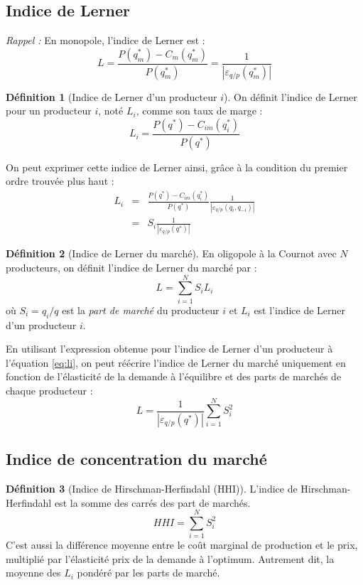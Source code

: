 \documentclass[
]{book}
\theoremstyle{definition}
\newtheorem{definition}{Définition}[chapter]
\theoremstyle{definition}
\theoremstyle{definition}
\theoremstyle{definition}
\theoremstyle{remark}
\begin{document}
\hypertarget{indice-de-lerner}{%
\subsection{Indice de Lerner}\label{indice-de-lerner}}

\emph{Rappel :} En monopole, l'indice de Lerner est :
\[L=\frac{P(q_m^*)-C_m(q_m^*)}{P(q_m^*)} = \frac{1}{\left|\varepsilon_{q/p}(q_m^*)\right|}\]

\begin{definition}[Indice de Lerner d'un producteur $i$]
On définit l'indice de Lerner pour un producteur \(i\), noté \(L_i\), comme son taux de marge :
\[L_i=\frac{P(q^*) -C_{im}(q^*_i)}{P(q^*)}\]
\end{definition}

On peut exprimer cette indice de Lerner ainsi, grâce à la condition du premier ordre trouvée plus haut :
\begin{equation}
\begin{array}{rcl}
L_i &=&\frac{P(q^*)-C_{im}(q_i^*)}{P(q^*)}\frac{1}{\left|\varepsilon_{q/p}(q_i, q_{-i})\right|}\\
&=&S_i\frac{1}{\left|\varepsilon_{q/p}(q^*)\right|}
\end{array}
\label{eq:li}
\end{equation}

\begin{definition}[Indice de Lerner du marché]
En oligopole à la Cournot avec \(N\) producteurs, on définit l'indice de Lerner du marché par :
\[L = \sum_{i=1}^NS_iL_i\]
où \(S_i=q_i/q\) est la \emph{part de marché} du producteur \(i\) et \(L_i\) est l'indice de Lerner d'un producteur \(i\).
\end{definition}

En utilisant l'expression obtenue pour l'indice de Lerner d'un producteur à l'équation \eqref{eq:li}, on peut réécrire l'indice de Lerner du marché uniquement en fonction de l'élasticité de la demande à l'équilibre et des parts de marchés de chaque producteur :
\[
L=\frac{1}{\left|\varepsilon_{q/p}(q^*)\right|}\sum_{i=1}^NS_i^2
\]

\hypertarget{indice-de-concentration-du-marchuxe9}{%
\subsection{Indice de concentration du marché}\label{indice-de-concentration-du-marchuxe9}}

\begin{definition}[Indice de Hirschman-Herfindahl (HHI)]
\protect\hypertarget{def:HHI}{}\label{def:HHI}L'indice de Hirschman-Herfindahl est la somme des carrés des part de marchés.
\[HHI = \sum_{i=1}^NS_i^2\]
C'est aussi la différence moyenne entre le coût marginal de production et le prix, multiplié par l'élasticité prix de la demande à l'optimum.
Autrement dit, la moyenne des \(L_i\) pondéré par les parts de marché.
\end{definition}
\end{document}
